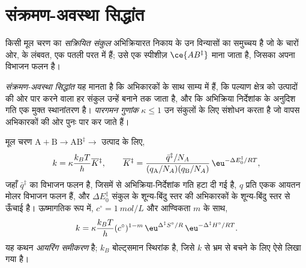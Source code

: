 \section{संक्रमण-अवस्था सिद्धांत}

\begin{definition}[सक्रियित संकुल]\label{def:b3:rate-theories:activated-complex}
किसी मूल चरण का \emph{सक्रियित संकुल}
अभिक्रियारत निकाय के उन विन्यासों का समुच्चय है जो  के चारों ओर,
 के लंबवत, एक पतली परत में हैं; उसे एक
स्पीशीज़ $\ce{AB^{\ddagger}}$ माना जाता है, जिसका अपना विभाजन फलन है।
\end{definition}

\begin{definition}\label{def:b3:rate-theories:tst}
\emph{संक्रमण-अवस्था सिद्धांत} यह मानता है कि
 अभिकारकों के साथ साम्य में हैं, कि पल्याण क्षेत्र को उत्पादों की ओर पार करने वाला
हर संकुल उन्हें बनाने तक जाता है, और कि
अभिक्रिया निर्देशांक के अनुदिश गति एक मुक्त स्थानांतरण है।
\emph{पारगमन गुणांक} $\kappa \le 1$ उन संकुलों के लिए संशोधन करता है
जो वापस अभिकारकों की ओर पुनः पार कर जाते हैं।
\end{definition}

\begin{theorem}\label{thm:b3:rate-theories:eyring}
मूल चरण $\mathrm{A + B} \to \mathrm{AB}^{\ddagger} \to$ उत्पाद के लिए,
\[
  k = \kappa\frac{k_BT}{h}\overline{K}{}^{\ddagger}, \qquad
  \overline{K}{}^{\ddagger} = \frac{\bar q^{\ddagger}/N_A}{(q_{\mathrm A}/N_A)(q_{\mathrm B}/N_A)}\,\eu^{-\Delta E_0^{\ddagger}/RT},
\]
जहाँ $\bar q^{\ddagger}$  का विभाजन फलन है, जिसमें से
अभिक्रिया-निर्देशांक गति हटा दी गई है, $q$ प्रति एकक आयतन मोलर विभाजन फलन हैं,
और $\Delta E_0^{\ddagger}$ संकुल के शून्य-बिंदु स्तर की अभिकारकों के शून्य-बिंदु स्तर से
ऊँचाई है। ऊष्मागतिक रूप में, $c^\circ = \qty{1}{mol/L}$ और
आण्विकता $m$ के साथ,
\[
  k = \kappa\frac{k_BT}{h}(c^\circ)^{1-m}\,\eu^{\Delta^{\ddagger}S^\circ/R}\,\eu^{-\Delta^{\ddagger}H^\circ/RT}.
\]
यह कथन \emph{आयरिंग समीकरण} है; $k_B$
बोल्ट्समान स्थिरांक है, जिसे $k$ से भ्रम से बचने के लिए ऐसे लिखा गया है।
\end{theorem}

